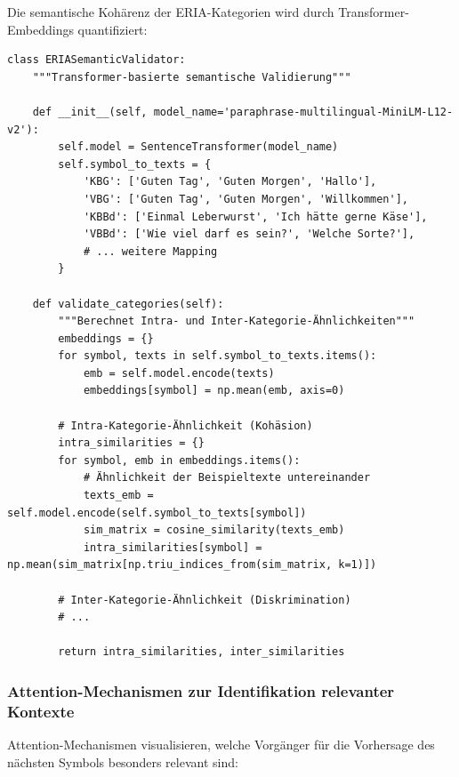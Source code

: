 \documentclass[12pt,a4paper]{article}
\begin{document}
Die semantische Kohärenz der ERIA-Kategorien wird durch Transformer-Embeddings 
quantifiziert:

\begin{lstlisting}[caption=Semantische Validierung in ERIA]
class ERIASemanticValidator:
    """Transformer-basierte semantische Validierung"""
    
    def __init__(self, model_name='paraphrase-multilingual-MiniLM-L12-v2'):
        self.model = SentenceTransformer(model_name)
        self.symbol_to_texts = {
            'KBG': ['Guten Tag', 'Guten Morgen', 'Hallo'],
            'VBG': ['Guten Tag', 'Guten Morgen', 'Willkommen'],
            'KBBd': ['Einmal Leberwurst', 'Ich hätte gerne Käse'],
            'VBBd': ['Wie viel darf es sein?', 'Welche Sorte?'],
            # ... weitere Mapping
        }
    
    def validate_categories(self):
        """Berechnet Intra- und Inter-Kategorie-Ähnlichkeiten"""
        embeddings = {}
        for symbol, texts in self.symbol_to_texts.items():
            emb = self.model.encode(texts)
            embeddings[symbol] = np.mean(emb, axis=0)
        
        # Intra-Kategorie-Ähnlichkeit (Kohäsion)
        intra_similarities = {}
        for symbol, emb in embeddings.items():
            # Ähnlichkeit der Beispieltexte untereinander
            texts_emb = self.model.encode(self.symbol_to_texts[symbol])
            sim_matrix = cosine_similarity(texts_emb)
            intra_similarities[symbol] = np.mean(sim_matrix[np.triu_indices_from(sim_matrix, k=1)])
        
        # Inter-Kategorie-Ähnlichkeit (Diskrimination)
        # ...
        
        return intra_similarities, inter_similarities
\end{lstlisting}

\subsubsection{Attention-Mechanismen zur Identifikation relevanter Kontexte}

Attention-Mechanismen visualisieren, welche Vorgänger für die Vorhersage 
des nächsten Symbols besonders relevant sind:
\end{document}
